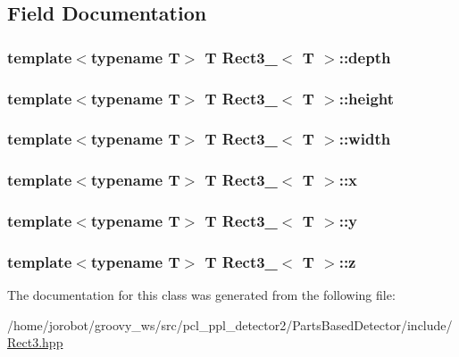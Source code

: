 \subsection{\-Field \-Documentation}
\hypertarget{classRect3___a73850e016f7e8152e47d430239c47cc2}{
\subsubsection[{depth}]{\setlength{\rightskip}{0pt plus 5cm}template$<$typename \-T$>$ \-T {\bf \-Rect3\-\_\-}$<$ \-T $>$\-::{\bf depth}}}\label{classRect3___a73850e016f7e8152e47d430239c47cc2}
\hypertarget{classRect3___a4f10fdcf15fe8cdb6b01a9b90d56ebe5}{
\subsubsection[{height}]{\setlength{\rightskip}{0pt plus 5cm}template$<$typename \-T$>$ \-T {\bf \-Rect3\-\_\-}$<$ \-T $>$\-::{\bf height}}}\label{classRect3___a4f10fdcf15fe8cdb6b01a9b90d56ebe5}
\hypertarget{classRect3___a780cbb24a81d6bbfff26c2ac6660beb8}{
\subsubsection[{width}]{\setlength{\rightskip}{0pt plus 5cm}template$<$typename \-T$>$ \-T {\bf \-Rect3\-\_\-}$<$ \-T $>$\-::{\bf width}}}\label{classRect3___a780cbb24a81d6bbfff26c2ac6660beb8}
\hypertarget{classRect3___a035f211c0c365a9dbd15436cb5448e31}{
\subsubsection[{x}]{\setlength{\rightskip}{0pt plus 5cm}template$<$typename \-T$>$ \-T {\bf \-Rect3\-\_\-}$<$ \-T $>$\-::{\bf x}}}\label{classRect3___a035f211c0c365a9dbd15436cb5448e31}
\hypertarget{classRect3___ab2c61e4e318bc064eb8bb707b699cbb6}{
\subsubsection[{y}]{\setlength{\rightskip}{0pt plus 5cm}template$<$typename \-T$>$ \-T {\bf \-Rect3\-\_\-}$<$ \-T $>$\-::{\bf y}}}\label{classRect3___ab2c61e4e318bc064eb8bb707b699cbb6}
\hypertarget{classRect3___a99bae7d4f2bf0af6a3ffbfb0fa752b9e}{
\subsubsection[{z}]{\setlength{\rightskip}{0pt plus 5cm}template$<$typename \-T$>$ \-T {\bf \-Rect3\-\_\-}$<$ \-T $>$\-::{\bf z}}}\label{classRect3___a99bae7d4f2bf0af6a3ffbfb0fa752b9e}


\-The documentation for this class was generated from the following file\-:\begin{DoxyCompactItemize}
\item 
/home/jorobot/groovy\-\_\-ws/src/pcl\-\_\-ppl\-\_\-detector2/\-Parts\-Based\-Detector/include/\hyperlink{Rect3_8hpp}{\-Rect3.\-hpp}\end{DoxyCompactItemize}
